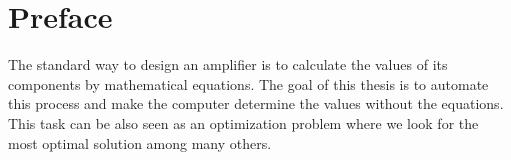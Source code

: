 \chapter{Preface}
The standard way to design an amplifier is to calculate the values of its components by mathematical equations. The goal of this thesis is to automate this process and make the computer determine the values without the equations.\\
This task can be also seen as an optimization problem where we look for the most optimal solution among many others.